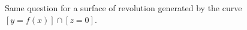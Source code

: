 \begin{exercice}\label{exo014}
Same question for a surface of revolution generated by the curve $[y=f(x)]\cap[z=0]$.
\end{exercice}
